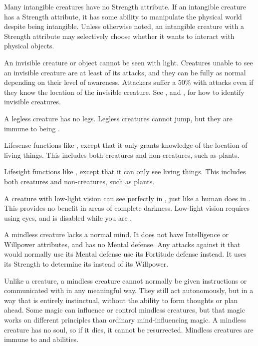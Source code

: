   Many intangible creatures have no Strength attribute.
  If an intangible creature has a Strength attribute, it has some ability to manipulate the physical world despite being intangible.
  Unless otherwise noted, an intangible creature with a Strength attribute may selectively choose whether it wants to interact with physical objects.

  An invisible creature or object cannot be seen with light.
  Creatures unable to see an invisible creature are at least \partiallyunaware of its attacks, and they can be fully \unaware as normal depending on their level of awareness.
  Attackers suffer a 50\%  with  attacks even if they know the location of the invisible creature.
  See , and , for how to identify invisible creatures.

  A legless creature has no legs.
  Legless creatures cannot jump, but they are immune to being \prone.

  Lifesense functions like , except that it only grants knowledge of the location of living things.
  This includes both creatures and non-creatures, such as plants.

  Lifesight functions like , except that it can only see living things.
  This includes both creatures and non-creatures, such as plants.

  A creature with low-light vision can see perfectly in , just like a human does in .
  This provides no benefit in areas of complete darkness.
  Low-light vision requires using eyes, and is disabled while you are \dazzled.

  A mindless creature lacks a normal mind.
  It does not have Intelligence or Willpower attributes, and has no Mental defense.
  Any attacks against it that would normally use its Mental defense use its Fortitude defense instead.
  It uses its Strength to determine its  instead of its Willpower.

  Unlike a  creature, a mindless creature cannot normally be given instructions or communicated with in any meaningful way.
  They still act autonomously, but in a way that is entirely instinctual, without the ability to form thoughts or plan ahead.
  Some magic can influence or control mindless creatures, but that magic works on different principles than ordinary mind-influencing magic.
  A mindless creature has no soul, so if it dies, it cannot be resurrected.
  Mindless creatures are immune to  and  abilities.

